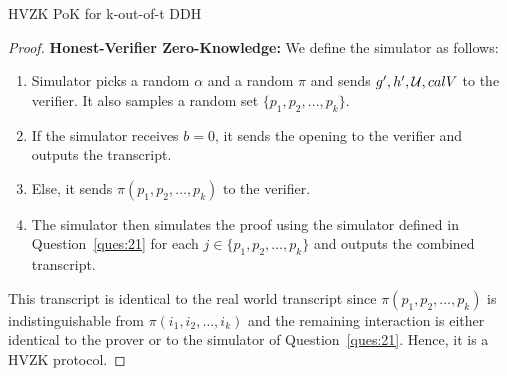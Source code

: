 \begin{solution}{HVZK PoK for k-out-of-t DDH}
\begin{proof}
        \textbf{Honest-Verifier Zero-Knowledge:} We define the simulator as follows:
        \begin{enumerate}
            \item Simulator picks a random $\alpha$ and a random $\pi$ and sends $g', h', \mathcal{U}, calV$ to the verifier. It also samples a random set $\{p_1, p_2, \ldots, p_k\}$.
            \item If the simulator receives $b = 0$, it sends the opening to the verifier and outputs the transcript.
            \item Else, it sends $\pi(p_1, p_2, \ldots, p_k)$ to the verifier.
            \item The simulator then simulates the proof using the simulator defined in Question~\ref{ques:21} for each $j \in \{p_1, p_2, \ldots, p_k\}$ and outputs the combined transcript.
        \end{enumerate}
        This transcript is identical to the real world transcript since $\pi(p_1, p_2, \ldots, p_k)$ is indistinguishable from $\pi(i_1, i_2, \ldots, i_k)$ and the remaining interaction is either identical to the prover or to the simulator of Question~\ref{ques:21}. Hence, it is a HVZK protocol.
    \end{proof}
\end{solution}
